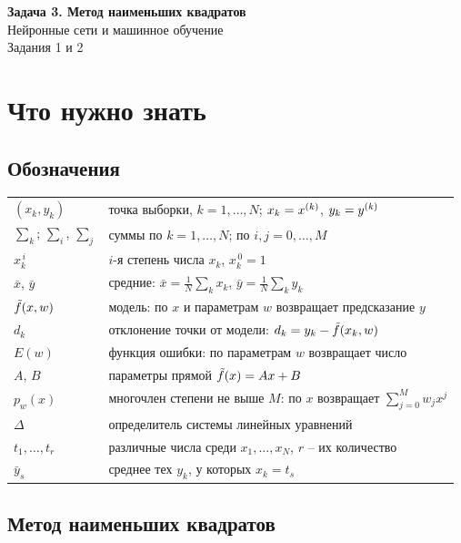 \documentclass[12pt,a4paper]{article}
\begin{document}
\begin{center}
  {\large\bfseries Задача 3. Метод наименьших квадратов}\\[1mm]
  Нейронные сети и машинное обучение\\[1mm]
  Задания 1 и 2
\end{center}

\section{Что нужно знать}

\subsection{Обозначения}

\begin{center}
\begin{tabular}{lp{}}
\toprule
$(x_k, y_k)$ & точка выборки, $k = 1, \dots, N$; $x_k = x^{(k)}$, $y_k = y^{(k)}$ \\
$\sum_k$; $\sum_i$, $\sum_j$ & суммы по $k = 1, \dots, N$; по $i, j = 0, \dots, M$ \\
$x_k^{\,i}$ & $i$-я степень числа $x_k$, $x_k^{\,0} = 1$ \\
$\bar x$, $\bar y$ & средние: $\bar x = \frac1N\sum_k x_k$,
  $\bar y = \frac1N\sum_k y_k$ \\
$\tilde{f}(x, w)$ & модель: по $x$ и параметрам $w$ возвращает предсказание $y$ \\
$d_k$ & отклонение точки от модели: $d_k = y_k - \tilde{f}(x_k, w)$ \\
$E(w)$ & функция ошибки: по параметрам $w$ возвращает число \\
$A$, $B$ & параметры прямой $\tilde{f}(x) = Ax + B$ \\
$p_w(x)$ & многочлен степени не выше $M$: по $x$ возвращает
  $\sum_{j=0}^{M} w_jx^j$ \\
$\Delta$ & определитель системы линейных уравнений \\
$t_1, \dots, t_r$ & различные числа среди $x_1, \dots, x_N$, $r$ -- их количество \\
$\bar y_s$ & среднее тех $y_k$, у которых $x_k = t_s$ \\
\bottomrule
\end{tabular}
\end{center}

\subsection{Метод наименьших квадратов}
\end{document}
